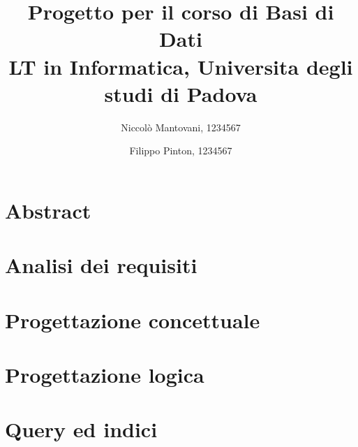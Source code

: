 \documentclass[a4paper,10pt]{article}
\begin{document}
\title{%
    Progetto per il corso di Basi di Dati \\
    \large LT in Informatica, Universita degli studi di Padova}
\author{Niccolò Mantovani, 1234567
    \and
    Filippo Pinton, 1234567}
\date{}

\maketitle


\section{Abstract}


\section{Analisi dei requisiti}


\section{Progettazione concettuale}


\section{Progettazione logica}


\section{Query ed indici}

\end{document}
